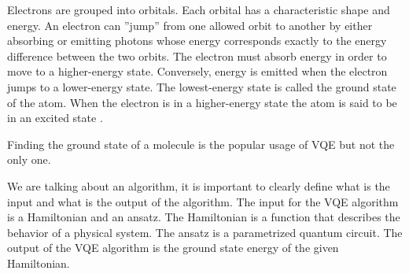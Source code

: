 Electrons are grouped into orbitals. Each orbital has a characteristic shape and energy. An electron can ''jump'' from one allowed orbit to another by either absorbing or emitting photons whose energy corresponds exactly to the energy difference between the two orbits. The electron must absorb energy in order to move to a higher-energy state. Conversely, energy is emitted when the electron jumps to a lower-energy state. The lowest-energy state is called the
ground state of the atom. When the electron is in a higher-energy state the atom is said to be in an excited state \cite{chemistry}.


Finding the ground state of a molecule is the popular usage of VQE but not the only one.


We are talking about an algorithm, it is important to clearly define what is the input and what is the output of the algorithm. The input for the VQE algorithm is a Hamiltonian and an ansatz. The Hamiltonian is a function that describes the behavior of a physical system. The ansatz is a parametrized quantum circuit. The output of the VQE algorithm is the ground state energy of the given Hamiltonian.
